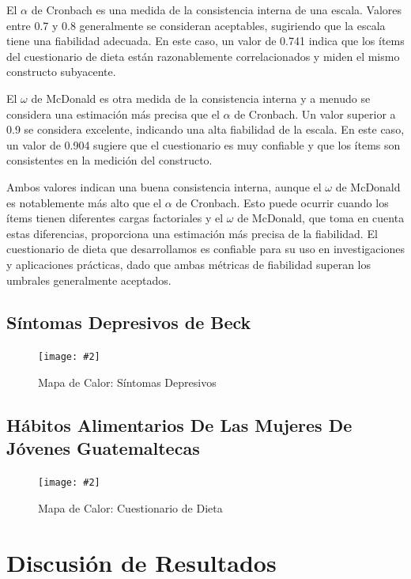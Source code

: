 \documentclass[jou]{apa7}
\newcommand{\includegraphicsmax}[2][]{%
	\texttt{[image: \#2]}%
}
\begin{document}
	El $\alpha$ de Cronbach es una medida de la consistencia interna de una escala.
	Valores entre 0.7 y 0.8 generalmente se consideran aceptables,
	sugiriendo que la escala tiene una fiabilidad adecuada. En este caso, un
	valor de 0.741 indica que los ítems del cuestionario de dieta están
	razonablemente correlacionados y miden el mismo constructo subyacente.

	El $\omega$ de McDonald es otra medida de la consistencia interna y a menudo se
	considera una estimación más precisa que el $\alpha$ de Cronbach. Un valor
	superior a 0.9 se considera excelente, indicando una alta fiabilidad de
	la escala. En este caso, un valor de 0.904 sugiere que el cuestionario
	es muy confiable y que los ítems son consistentes en la medición del
	constructo.

	Ambos valores indican una buena consistencia interna, aunque el $\omega$ de
	McDonald es notablemente más alto que el $\alpha$ de Cronbach. Esto puede
	ocurrir cuando los ítems tienen diferentes cargas factoriales y el $\omega$ de
	McDonald, que toma en cuenta estas diferencias, proporciona una
	estimación más precisa de la fiabilidad. El cuestionario de dieta que
	desarrollamos es confiable para su uso en investigaciones y aplicaciones
	prácticas, dado que ambas métricas de fiabilidad superan los umbrales
	generalmente aceptados.

	\subsection{Síntomas Depresivos de Beck}
		\begin{figure}[H]
		\centering
		\includegraphicsmax{sintomasDepresivosBeckGraph.pdf}
		\caption{Mapa de Calor: Síntomas Depresivos}
		\label{fig:Figure2}
	\end{figure}
	\vspace{-1em} %

	\subsection{Hábitos Alimentarios De Las Mujeres De Jóvenes Guatemaltecas}
		\begin{figure}[H]
			\centering
			\includegraphicsmax{dietGraph.pdf}
			\caption{Mapa de Calor: Cuestionario de Dieta}
			\label{fig:Figure3}
		\end{figure}

	\section{Discusión de Resultados}\label{discusiuxf3n-de-resultados}
\end{document}
